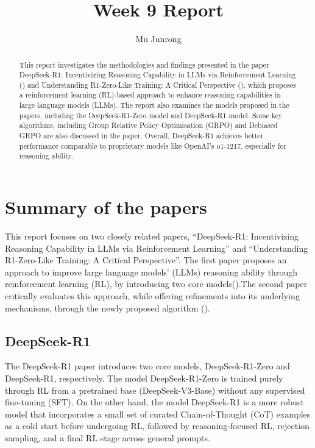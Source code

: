 \documentclass{article} %
\title{Week 9 Report}
\author{Mu Junrong}
\begin{document}
\ifcolmsubmission
\linenumbers
\fi

\maketitle

\begin{abstract}
This report investigates the methodologies and findings presented in the paper DeepSeek-R1: Incentivizing Reasoning Capability in LLMs via
Reinforcement Learning (\cite{deepseek2024r1})
and Understanding R1-Zero-Like Training: A Critical Perspective (\cite{liu2025understandingr1zeroliketrainingcritical}), which proposes a reinforcement learning (RL)-based approach to enhance reasoning capabilities in large language models (LLMs). The report also examines the models proposed in the papers, including the DeepSeek-R1-Zero model and DeepSeek-R1 model. Some key algorithms, including Group Relative Policy Optimisation (GRPO) and Debiased GRPO are also discussed in the paper. Overall, DeepSeek-R1 achieves better performance comparable to proprietary models like OpenAI’s o1-1217, especially for reasoning ability.


\end{abstract}

\section{Summary of the papers}
This report focuses on two closely related papers, “DeepSeek-R1: Incentivizing Reasoning Capability in LLMs via Reinforcement Learning” and “Understanding R1-Zero-Like Training: A Critical Perspective”. The first paper proposes an approach to improve large language models' (LLMs) reasoning ability through reinforcement learning (RL), by introducing two core models(\cite{deepseek2024r1}).The second paper critically evaluates this approach, while offering refinements into its underlying mechanisms, through the newly proposed algorithm (\cite{liu2025understandingr1zeroliketrainingcritical}). 

\subsection{DeepSeek-R1}
The DeepSeek-R1 paper introduces two core models, DeepSeek-R1-Zero and DeepSeek-R1, respectively. The model DeepSeek-R1-Zero is trained purely through RL from a pretrained base (DeepSeek-V3-Base) without any supervised fine-tuning (SFT). On the other hand, the model DeepSeek-R1 is a more robust model that incorporates a small set of curated Chain-of-Thought (CoT) examples as a cold start before undergoing RL, followed by reasoning-focused RL, rejection sampling, and a final RL stage across general prompts. 
\end{document}
